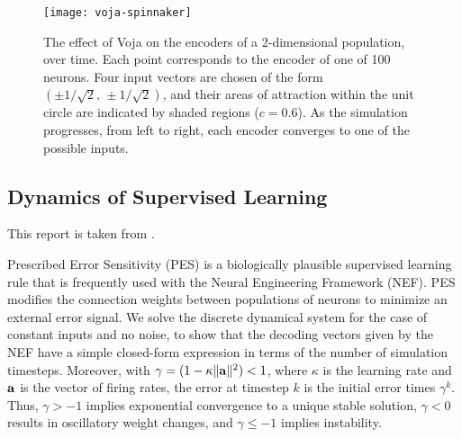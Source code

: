 %
%
\begin{figure*}[!htb]
  \centering
  \texttt{[image: voja-spinnaker]}
  \caption{
The effect of Voja on the encoders of a 2-dimensional population, over time.
Each point corresponds to the encoder of one of \num{100} neurons.
Four input vectors are chosen of the form $(\pm 1 / \sqrt{2}, \, \pm 1 / \sqrt{2})$, and their areas of attraction within the unit circle are indicated by shaded regions ($c = 0.6$).
As the simulation progresses, from left to right, each encoder converges to one of the possible inputs.
}
  \label{fig:plasticity_nef/voja_encoders}
\end{figure*}

\subsection{Dynamics of Supervised Learning}

This report is taken from \citep{voelker2015}.

Prescribed Error Sensitivity (PES) is a biologically plausible supervised learning rule that is frequently used with the Neural Engineering Framework (NEF). PES modifies the connection weights between populations of neurons to minimize an external error signal. We solve the discrete dynamical system for the case of constant inputs and no noise, to show that the decoding vectors given by the NEF have a simple closed-form expression in terms of the number of simulation timesteps. Moreover, with $\gamma = (1 - \kappa \|\mathbf{a}\|^2) < 1$, where $\kappa$ is the learning rate and $\mathbf{a}$ is the vector of firing rates, the error at timestep $k$ is the initial error times $\gamma^k$. Thus, $\gamma > - 1$ implies exponential convergence to a unique stable solution, $\gamma < 0 $ results in oscillatory weight changes, and $\gamma \le -1$ implies instability.

